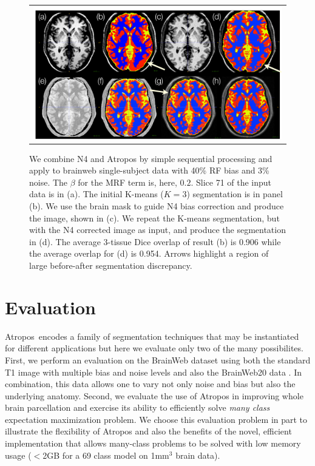 \documentclass[11pt,english]{article}
\begin{document}
\begin{figure}
\begin{center}
\begin{tabular}{c}
\includegraphics[width=6in]{Figures/bwebN4ex.pdf}
\end{tabular}
\caption{\baselineskip 12pt \small We combine N4 and Atropos by simple
sequential processing and apply to brainweb single-subject data with
40\% RF bias and 3\% noise.  The $\beta$ for the MRF term is, here,
$0.2$.  Slice 71 of the input data is in (a).  The initial K-means
($K=3$) segmentation is in panel (b).  We use the brain mask to guide
N4 bias correction and produce the image, shown in (c).  We repeat the
K-means segmentation, but with the N4 corrected image as input, and
produce the segmentation in (d).  The average 3-tissue Dice overlap of
result (b) is 0.906 while the average overlap for (d) is 0.954.
Arrows highlight a region of large before-after segmentation
discrepancy.}
\label{fig:bwebrf40}
\end{center}
\end{figure}


\section{Evaluation}
Atropos~encodes a family of segmentation techniques that may be
instantiated for different applications but here we evaluate only two
of the many possibilites. First, we perform an evaluation on the
BrainWeb dataset using both the standard T1 image with multiple bias
and noise levels and also the BrainWeb20 data
\citep{Aubert-Broche2006a,Battaglini2008}.  In combination, this data
allows one to vary not only noise and bias but also the underlying
anatomy.  Second, we evaluate the use of Atropos in improving whole
brain parcellation and exercise its ability to efficiently solve {\em
many class} expectation maximization problem.  We choose this
evaluation problem in part to illustrate the flexibility of Atropos
and also the benefits of the novel, efficient implementation that
allows many-class problems to be solved with low memory usage ($<$2GB
for a 69 class model on 1mm$^3$ brain data).
\end{document}

